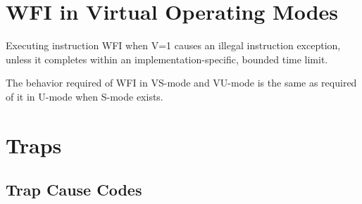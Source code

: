 \section{WFI in Virtual Operating Modes}

Executing instruction WFI when V=1 causes an illegal instruction
exception, unless it completes within an implementation-specific, bounded time
limit.

\begin{commentary}
The behavior required of WFI in VS-mode and VU-mode is the same as required of
it in U-mode when S-mode exists.
\end{commentary}

\section{Traps}

\subsection{Trap Cause Codes}

